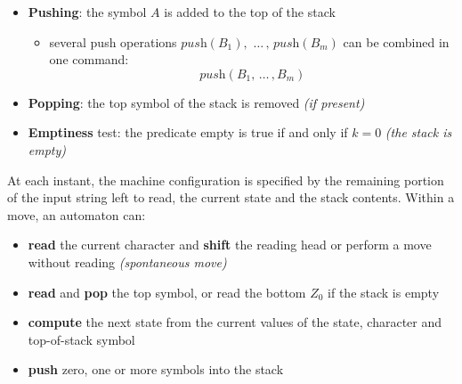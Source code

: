 \documentclass[english]{article}
\begin{document}
\begin{itemize}
  \item \textbf{Pushing}: the symbol \(A\) is added to the top of the stack
        \begin{itemize}[label=\(\rightarrow\)]
          \item several push operations \(\textit{push}(B_1), \, \,\ldots\, , \, \textit{push}(B_m)\) can be combined in one command:
                \[ \textit{push}(B_1, \,\ldots\, , B_m) \]
        \end{itemize}
  \item \textbf{Popping}: the top symbol of the stack is removed \textit{(if present)}
  \item \textbf{Emptiness} test: the predicate empty is true if and only if \(k=0\) \textit{(the stack is empty)}
\end{itemize}

At each instant, the machine configuration is specified by the remaining portion of the input string left to read, the current state and the stack contents.
Within a move, an automaton can:

\begin{itemize}
  \item \textbf{read} the current character and \textbf{shift} the reading head or perform a move without reading \textit{(spontaneous move)}
  \item \textbf{read} and \textbf{pop} the top symbol, or read the bottom \(Z_0\) if the stack is empty
  \item \textbf{compute} the next state from the current values of the state, character and top-of-stack symbol
  \item \textbf{push} zero, one or more symbols into the stack
\end{itemize}
\end{document}
